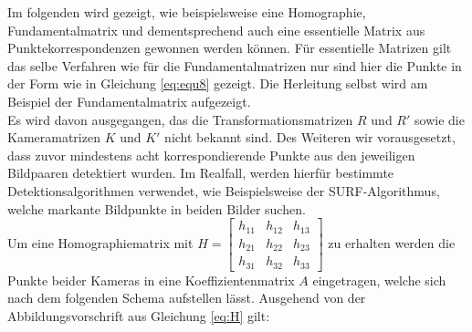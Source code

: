 Im folgenden wird gezeigt, wie beispielsweise eine Homographie, Fundamentalmatrix und dementsprechend auch eine essentielle Matrix aus Punktekorrespondenzen gewonnen werden können. Für essentielle Matrizen gilt das selbe Verfahren wie für die Fundamentalmatrizen nur sind hier die Punkte in der Form wie in Gleichung \ref{eq:equ8} gezeigt. Die Herleitung selbst wird am Beispiel der Fundamentalmatrix aufgezeigt.\\

Es wird davon ausgegangen, das die Transformationsmatrizen $R$ und $R'$ sowie die Kameramatrizen $K$ und $K'$ nicht bekannt sind. Des Weiteren wir vorausgesetzt, dass zuvor mindestens acht korrespondierende Punkte aus den jeweiligen Bildpaaren detektiert wurden. Im Realfall, werden hierfür bestimmte Detektionsalgorithmen verwendet, wie Beispielsweise der SURF-Algorithmus\cite{SURF}, welche markante Bildpunkte in beiden Bilder suchen.\\


Um eine Homographiematrix mit 
$H=
\begin{bmatrix}
h_{11}&h_{12}&h_{13}\\
h_{21}&h_{22}&h_{23}\\
h_{31}&h_{32}&h_{33}
\end{bmatrix}
$ zu erhalten werden die Punkte beider Kameras in eine Koeffizientenmatrix $A$ eingetragen, welche sich nach dem folgenden Schema aufstellen lässt\cite{HZ,Elements}. Ausgehend von der Abbildungsvorschrift aus Gleichung \ref{eq:H} gilt:

